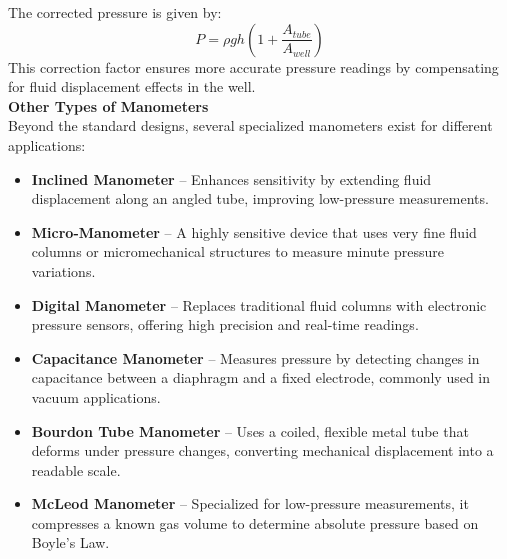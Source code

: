 \documentclass{article}
\begin{document}
The corrected pressure is given by:  
\begin{equation}
	P = \rho g h \left(1 + \frac{A_{tube}}{A_{well}}\right)
\end{equation}
This correction factor ensures more accurate pressure readings by compensating for fluid displacement effects in the well.\\[8pt]
\noindent
\textbf{Other Types of Manometers}\\[8pt]
Beyond the standard designs, several specialized manometers exist for different applications:
\begin{itemize}
	\item \textbf{Inclined Manometer} – Enhances sensitivity by extending fluid displacement along an angled tube, improving low-pressure measurements. 
	\item \textbf{Micro-Manometer} – A highly sensitive device that uses very fine fluid columns or micromechanical structures to measure minute pressure variations.
	
	\item \textbf{Digital Manometer} – Replaces traditional fluid columns with electronic pressure sensors, offering high precision and real-time readings.
	
	\item \textbf{Capacitance Manometer} – Measures pressure by detecting changes in capacitance between a diaphragm and a fixed electrode, commonly used in vacuum applications.
	
	\item \textbf{Bourdon Tube Manometer} – Uses a coiled, flexible metal tube that deforms under pressure changes, converting mechanical displacement into a readable scale.
	
	\item \textbf{McLeod Manometer} – Specialized for low-pressure measurements, it compresses a known gas volume to determine absolute pressure based on Boyle’s Law.
	
\end{itemize}
\end{document}
